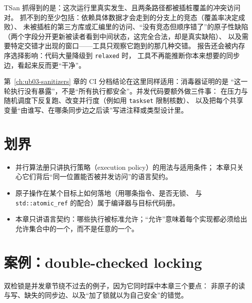 \documentclass[12pt,a4paper,fontset=fandol]{ctexbook}
\newcommand{\Tp}[1]{\texttt{#1}}
\begin{document}
TSan 抓得到的是：这次运行里真实发生、且两条路径都被插桩覆盖的冲突访问对。
抓不到的至少包括：依赖具体数据才会走到的分支上的竞态（覆盖率决定成败）、
未被插桩的第三方库或汇编里的访问、“没有竞态但顺序错了”的原子性缺陷
（两个字段分开更新被读者看到中间状态，这完全合法，却是真实缺陷）、
以及需要特定交错才出现的窗口——工具只观察它跑到的那几种交错。
报告还会被内存序选择影响：代码大量降级到 \Tp{relaxed} 时，
工具不再能推断你本来想要的同步边，看起来反而更“干净”。

\begin{note}[title={TSan 全绿不等于没有竞态}]
第~\ref{ch:ub03-sanitizers} 章的 CI 分档结论在这里同样适用：消毒器证明的是
“这一轮执行没有暴露”，不是“所有执行都安全”。并发代码要额外做三件事：
在压力与随机调度下反复跑、改变并行度（例如用 \Tp{taskset} 限制核数）、
以及把每个共享变量“由谁写、在哪条同步边之后读”写进注释或类型设计里。
\end{note}

\section{划界}\label{sec:ub10-scope}

\begin{itemize}
  \item 并行算法册只讲执行策略（execution policy）的用法与适用条件；
        本章只关心它们背后“同一位置能否被并发访问”的语言契约。
  \item 原子操作在某个目标上如何落地（用哪条指令、是否无锁、
        与 \Tp{std::atomic\_ref} 的配合）属于编译器与目标代码册。
  \item 本章只讲语言契约：哪些执行被标准允许；“允许”意味着每个实现都必须给出
        允许集合中的一个，而不是任意的一个。
\end{itemize}

\section{案例：double-checked locking}\label{sec:ub10-dcl}

双检锁是并发章节绕不过去的例子，因为它同时踩中本章三个要点：
非原子的读与写、缺失的同步边、以及“加了锁就以为自己安全”的错觉。
\end{document}
